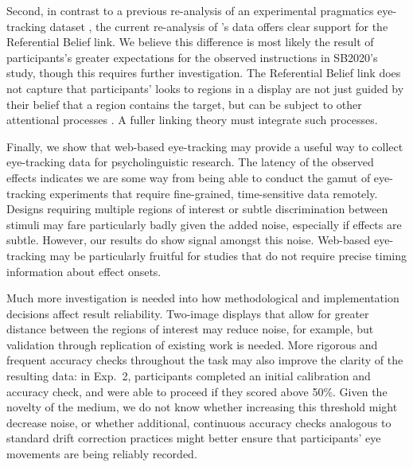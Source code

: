 \documentclass[10pt,letterpaper]{article}
\begin{document}
Second,  in  contrast to a previous re-analysis of an experimental pragmatics eye-tracking dataset \cite{QingLD2018}, the current re-analysis of 's data offers clear support for the Referential Belief link.  We believe this difference is most likely the result of participants's greater expectations for the observed instructions in SB2020's study, though this requires further investigation. %
The Referential Belief link does not capture that participants' looks to regions in a display are not just guided by their belief that a region contains the target, but can be subject to other attentional processes \cite{Allopenna1998}. A fuller linking theory must integrate such processes.


Finally, we show that web-based eye-tracking  may provide a useful way to collect eye-tracking data for psycholinguistic research. The latency of the observed effects indicates we are some way from being able to conduct the gamut of eye-tracking experiments that require fine-grained, time-sensitive data remotely. Designs requiring multiple regions of interest or subtle discrimination between stimuli  may fare particularly badly given the added noise, especially if effects are subtle. However, our results do show signal amongst this noise. Web-based eye-tracking may be particularly fruitful for studies that do not require precise timing information about effect onsets.

Much more investigation is needed into how  methodological and implementation decisions affect result reliability. Two-image displays that allow for greater distance between the regions of interest may reduce noise, for example, but validation through replication of existing work is needed. More rigorous and frequent accuracy checks throughout the task may also improve the clarity of the resulting data: in Exp.~2, participants completed an initial calibration and accuracy check, and were able to proceed if they scored above 50\%. Given the novelty of the medium, we do not know whether increasing this threshold might decrease noise, or whether additional, continuous accuracy checks analogous to standard drift correction practices might better ensure that participants' eye movements are being reliably recorded.
\end{document}
